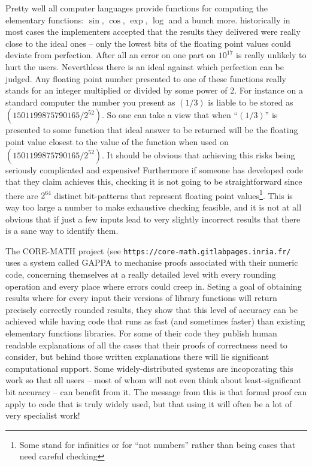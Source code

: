 Pretty well all computer languages provide functions for computing the
elementary functions: $\sin$, $\cos$, $\exp$, $\log$ and a bunch more.
historically in most cases the implementers accepted that the results
they delivered were really close to the ideal ones -- only the lowest
bits of the floating point values could deviate from perfection. After
all an error on one part on $10^17$ is really unlikely to hurt the users.
Neverthless there is an ideal against which perfection can be judged.
Any floating point number presented to one of these functions really
stands for an integer multiplied or divided by some power of 2. For instance
on a standard computer the number you present as $(1/3)$ is liable
to be stored as $(1501199875790165/2^{52})$. So one can take a view that
when ``$(1/3)$'' is presented to some function that ideal answer to be
returned will be the floating point value closest to the value
of the function when used on $(1501199875790165/2^{52})$. It should be
obvious that achieving this risks being seriously complicated and expensive!
Furthermore if someone has developed code that they claim achieves this,
checking it is not going to be straightforward since there are $2^64$
distinct bit-patterns that represent floating point values\footnote{Some
stand for infinities or for ``not numbers'' rather than being cases that need
careful checking}. This is way too large a number to make exhaustive checking
feasible, and it is not at all obvious that if just a few inputs lead to
very slightly incorrect results that there is a sane way to identify them.

The CORE-MATH project (see \verb+https://core-math.gitlabpages.inria.fr/+
uses a system called GAPPA to mechanise proofs associated with their
numeric code, concerning themselves at a really detailed level with every
rounding operation and every place where errors could creep in. Seting a
goal of obtaining results where for every input their versions of library
functions will return precisely correctly rounded results, they show that
this level of accuracy can be achieved while having code that runs as
fast (and sometimes faster) than existing elementary functions libraries.
For some of their code they publish human readable explanations of all the
cases that their proofs of correctness need to consider, but behind those
written explanations there will lie significant computational support.
Some widely-distributed systems are incoporating this work so that all
users -- most of whom will not even think about least-significant bit
accuracy -- can benefit from it. The message from this is that formal
proof can apply to code that is truly widely used, but that using it will
often be a lot of very specialist work!

 